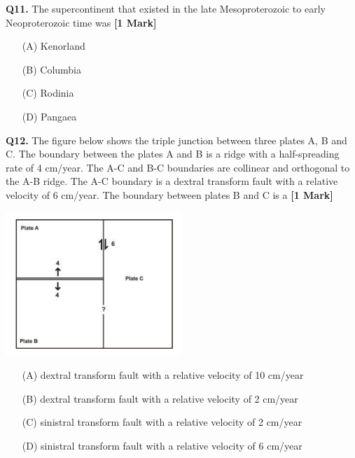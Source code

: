 \documentclass[11pt]{article}
\newcommand{\questiona}[2]{
    \noindent\textbf{Q#2.} #1 \hfill \textbf{[1 Mark]}
}
\begin{document}
\questiona{The supercontinent that existed in the late Mesoproterozoic to early Neoproterozoic time was}{11}
\begin{enumerate}
    \item[(A)] Kenorland
    \item[(B)] Columbia
    \item[(C)] Rodinia
    \item[(D)] Pangaea
\end{enumerate}
\vspace{0.5cm}

\questiona{The figure below shows the triple junction between three plates A, B and C. The boundary between the plates A and B is a ridge with a half-spreading rate of 4 cm/year. The A-C and B-C boundaries are collinear and orthogonal to the A-B ridge. The A-C boundary is a dextral transform fault with a relative velocity of 6 cm/year. The boundary between plates B and C is a}{12}
\begin{center}
\includegraphics[width=0.5\textwidth]{figures/12}
\end{center}
\begin{enumerate}
    \item[(A)] dextral transform fault with a relative velocity of 10 cm/year
    \item[(B)] dextral transform fault with a relative velocity of 2 cm/year
    \item[(C)] sinistral transform fault with a relative velocity of 2 cm/year
    \item[(D)] sinistral transform fault with a relative velocity of 6 cm/year
\end{enumerate}
\vspace{0.5cm}
\end{document}
